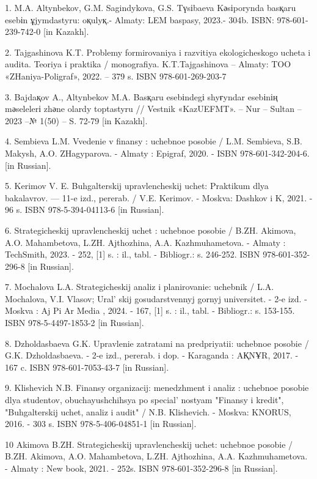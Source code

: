 \begin{references}

1. M.A. Altynbekov, G.M. Sagindykova, G.S. Tүsіbaeva Kәsіporynda basқaru
esebіn ұjymdastyru: oқulyқ.- Almaty: LEM baspasy, 2023.- 304b. ISBN:
978-601-239-742-0 {[}in Kazakh{]}.

2. Tajgashinova K.T. Problemy formirovaniya i razvitiya ekologicheskogo
ucheta i audita. Teoriya i praktika / monografiya. K.T.Tajgashinova --
Almaty: TOO «ZHaniya-Poligraf», 2022. -- 379 s. ISBN 978-601-269-203-7

3. Bajdaқov A., Altynbekov M.A. Basқaru esebіndegі shyғyndar esebіnің
mәselelerі zhәne olardy toptastyru // Vestnik «KazUEFMT». -- Nur --
Sultan -- 2023 --№ 1(50) -- S. 72-79 {[}in Kazakh{]}.

4. Sembieva L.M. Vvedenie v finansy : uchebnoe posobie / L.M. Sembieva,
S.B. Makysh, A.O. ZHagyparova. - Almaty : Epigraf, 2020. - ISBN
978-601-342-204-6. {[}in Russian{]}.

5. Kerimov V. E. Buhgalterskij upravlencheskij uchet: Praktikum dlya
bakalavrov. --- 11-e izd., pererab. / V.E. Kerimov. - Moskva: Dashkov i
K, 2021. - 96 s. ISBN 978-5-394-04113-6 {[}in Russian{]}.

6. Strategicheskij upravlencheskij uchet : uchebnoe posobie / B.ZH.
Akimova, A.O. Mahambetova, L.ZH. Ajthozhina, A.A. Kazhmuhametova. -
Almaty : TechSmith, 2023. - 252, {[}1{]} s. : il., tabl. - Bibliogr.: s.
246-252. ISBN 978-601-352-296-8 {[}in Russian{]}.

7. Mochalova L.A. Strategicheskij analiz i planirovanie: uchebnik / L.A.
Mochalova, V.I. Vlasov; Ural' skij gosudarstvennyj gornyj
universitet. - 2-e izd. - Moskva : Aj Pi Ar Media , 2024. - 167, {[}1{]}
s. : il., tabl. - Bibliogr.: s. 153-155. ISBN 978-5-4497-1853-2 {[}in
Russian{]}.

8. Dzholdasbaeva G.K. Upravlenie zatratami na predpriyatii: uchebnoe
posobie / G.K. Dzholdasbaeva. - 2-e izd., pererab. i dop. - Karaganda :
AҚNҰR, 2017. - 167 c. ISBN 978-601-7053-43-7 {[}in Russian{]}.

9. Klishevich N.B. Finansy organizacij: menedzhment i analiz : uchebnoe
posobie dlya studentov, obuchayushchihsya po
special' nostyam "Finansy i kredit", "Buhgalterskij
uchet, analiz i audit" / N.B. Klishevich. - Moskva: KNORUS, 2016. - 303
s. ISBN 978-5-406-04851-1 {[}in Russian{]}.

10 Akimova B.ZH. Strategicheskij upravlencheskij uchet: uchebnoe posobie
/ B.ZH. Akimova, A.O. Mahambetova, L.ZH. Ajthozhina, A.A.
Kazhmuhametova. - Almaty : New book, 2021. - 252s. ISBN
978-601-352-296-8 {[}in Russian{]}.


\end{references}
